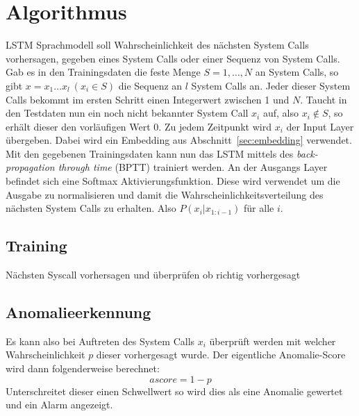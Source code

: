     \section{Algorithmus}\label{sec:Algorithmus}
        LSTM Sprachmodell soll Wahrscheinlichkeit des nächsten System Calls vorhersagen, gegeben eines System Calls oder einer Sequenz von System Calls.
        Gab es in den Trainingsdaten die feste Menge $S = {1,\dots,N}$ an System Calls, so gibt $x=x_1\dots x_l \ (x_i\in S)$ die Sequenz an $l$ System Calls an.
        Jeder dieser System Calls bekommt im ersten Schritt einen Integerwert zwischen 1 und $N$.
        Taucht in den Testdaten nun ein noch nicht bekannter System Call $x_i$ auf, also $x_i \notin S$, so erhält dieser den vorläufigen Wert 0.
        Zu jedem Zeitpunkt wird $x_i$ der Input Layer übergeben.
        Dabei wird ein Embedding aus Abschnitt~\ref{sec:embedding} verwendet. 
        Mit den gegebenen Trainingsdaten kann nun das LSTM mittels des \textit{back-propagation through time} (BPTT) trainiert werden.
        An der Ausgangs Layer befindet sich eine Softmax Aktivierungsfunktion.
        Diese wird verwendet um die Ausgabe zu normalisieren und damit die Wahrscheinlichkeitsverteilung des nächsten System Calls zu erhalten.
        Also $P\left(x_i|x_{1:i-1}\right)$ für alle $i$. 
        

        \subsection{Training}\label{sec:Training}
            Nächsten Syscall vorhersagen und überprüfen ob richtig vorhergesagt
        \subsection{Anomalieerkennung}\label{sec:Anomalieerkennung}
            Es kann also bei Auftreten des System Calls $x_i$ überprüft werden mit welcher Wahrscheinlichkeit $p$ dieser vorhergesagt wurde.
            Der eigentliche Anomalie-Score wird dann folgenderweise berechnet:
            \begin{equation}
                ascore = 1 - p
            \end{equation}
            Unterschreitet dieser einen Schwellwert so wird dies als eine Anomalie gewertet und ein Alarm angezeigt.
